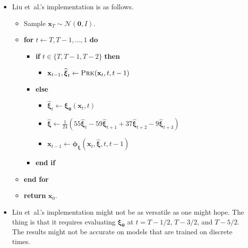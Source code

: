 \documentclass[10pt]{article}
\newcommand{\ve}[1]{\mathbf{#1}}
\newcommand{\ves}[1]{\boldsymbol{#1}}
\newcommand{\etal}{{et~al.}}
\newcommand{\mcal}[1]{\mathcal{#1}}
\begin{document}
\begin{itemize}
  \item Liu \etal's implementation is as follows.
  \begin{itemize}
    \item[] Sample $\ve{x}_T \sim \mcal{N}(\ve{0},I)$.
    \item[] {\bf for} $t \leftarrow T, T-1, \dotsc, 1$ {\bf do}
    \begin{itemize}      
      \item[] {\bf if} $t \in \{T, T-1, T-2\}$ {\bf then}
      \begin{itemize}
        \item[] $\ve{x}_{t-1}, \widehat{\ves{\xi}}_t \leftarrow \textsc{Prk}(\ve{x}_t, t, t-1)$
      \end{itemize}
      \item[] {\bf else}
      \begin{itemize}
        \item[] $\widehat{\ves{\xi}}_t \leftarrow \ves{\xi}_{\ves{\theta}}(\ve{x}_t, t)$
        \item[] $\widehat{\ves{\xi}} \leftarrow \frac{1}{24} (55\widehat{\ves{\xi}}_t - 59\widehat{\ves{\xi}}_{t+1} + 37\widehat{\ves{\xi}}_{t+2} -9\widehat{\ves{\xi}}_{t+3})$
        \item[] $\ve{x}_{t-1} \leftarrow \ves{\phi}_{\ves{\xi}}(\ve{x}_t, \widehat{\ves{\xi}}, t, t-1)$
      \end{itemize}
      \item[] {\bf end if}      
    \end{itemize}
    \item[] {\bf end for}
    \item[] {\bf return} $\ve{x}_0$.
  \end{itemize}

  \item Liu \etal's implementation might not be as versatile as one might hope. The thing is that it requires evaluating $\ves{\xi}_{\ves{\theta}}$ at $t = T-1/2$, $T-3/2$, and $T-5/2$. The results might not be accurate on models that are trained on discrete times.
\end{itemize}


  
\end{document}
